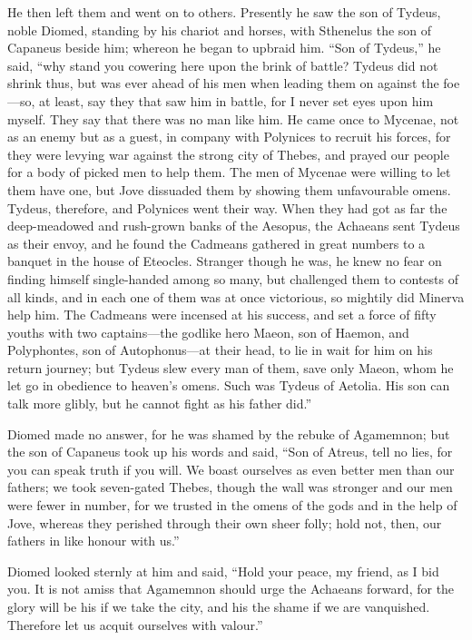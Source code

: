 He then left them and went on to others. Presently he saw the son of
Tydeus, noble Diomed, standing by his chariot and horses, with Sthenelus
the son of Capaneus beside him; whereon he began to upbraid him. “Son of
Tydeus,” he said, “why stand you cowering here upon the brink of battle?
Tydeus did not shrink thus, but was ever ahead of his men when leading
them on against the foe—so, at least, say they that saw him in
battle, for I never set eyes upon him myself. They say that there was no
man like him. He came once to Mycenae, not as an enemy but as a guest, in
company with Polynices to recruit his forces, for they were levying war
against the strong city of Thebes, and prayed our people for a body of
picked men to help them. The men of Mycenae were willing to let them have
one, but Jove dissuaded them by showing them unfavourable omens. Tydeus,
therefore, and Polynices went their way. When they had got as far the
deep-meadowed and rush-grown banks of the Aesopus, the Achaeans sent
Tydeus as their envoy, and he found the Cadmeans gathered in great numbers
to a banquet in the house of Eteocles. Stranger though he was, he knew no
fear on finding himself single-handed among so many, but challenged them
to contests of all kinds, and in each one of them was at once victorious,
so mightily did Minerva help him. The Cadmeans were incensed at his
success, and set a force of fifty youths with two captains—the
godlike hero Maeon, son of Haemon, and Polyphontes, son of Autophonus—at
their head, to lie in wait for him on his return journey; but Tydeus slew
every man of them, save only Maeon, whom he let go in obedience to
heaven’s omens. Such was Tydeus of Aetolia. His son can talk more glibly,
but he cannot fight as his father did.”

Diomed made no answer, for he was shamed by the rebuke of Agamemnon; but
the son of Capaneus took up his words and said, “Son of Atreus, tell no
lies, for you can speak truth if you will. We boast ourselves as even
better men than our fathers; we took seven-gated Thebes, though the wall
was stronger and our men were fewer in number, for we trusted in the omens
of the gods and in the help of Jove, whereas they perished through their
own sheer folly; hold not, then, our fathers in like honour with us.”

Diomed looked sternly at him and said, “Hold your peace, my friend, as I
bid you. It is not amiss that Agamemnon should urge the Achaeans forward,
for the glory will be his if we take the city, and his the shame if we are
vanquished. Therefore let us acquit ourselves with valour.”


